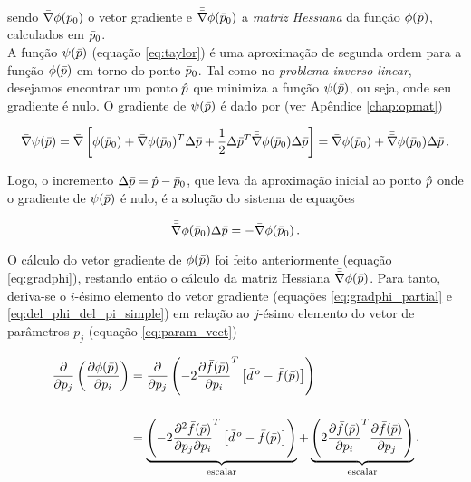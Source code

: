 \noindent sendo $\bar{\nabla}\phi(\bar{p}_0)$ o vetor gradiente  e
$\bar{\bar{\nabla}}\phi(\bar{p}_0)$ a {\it matriz Hessiana} da função $\phi(\bar{p})$,
calculados em $\bar{p}_0$.
\\
\indent A função $\psi(\bar{p})$ (equação \ref{eq:taylor}) é uma aproximação
de segunda ordem para a função $\phi(\bar{p})$ em torno do ponto $\bar{p}_0$.
Tal como no {\it problema inverso linear}, desejamos encontrar um ponto $\hat{p}$
que minimiza a função $\psi(\bar{p})$, ou seja, onde seu gradiente é nulo.
O gradiente de $\psi(\bar{p})$ é dado por (ver Apêndice \ref{chap:opmat})

\begin{equation}
\bar{\nabla}\psi(\bar{p}) = \bar{\nabla}\left[
    \phi(\bar{p}_0) +
    \bar{\nabla}\phi(\bar{p}_0)^T\Delta\bar{p} +
    \frac{1}{2}\Delta\bar{p}^T\bar{\bar{\nabla}}\phi(\bar{p}_0)\Delta\bar{p}
    \right] =
    \bar{\nabla}\phi(\bar{p}_0) + \bar{\bar{\nabla}}\phi(\bar{p}_0)\Delta\bar{p}
    \thinspace .
\end{equation}

\noindent Logo, o incremento $\Delta\bar{p} = \hat{p} - \bar{p}_0$, que leva
da aproximação inicial ao ponto $\hat{p}$ onde o gradiente de $\psi(\bar{p})$ é
nulo, é a solução do sistema de equações

\begin{equation}
     \bar{\bar{\nabla}}\phi(\bar{p}_0)\Delta\bar{p} = -\bar{\nabla}\phi(\bar{p}_0)
    \thinspace .
\label{eq:sistema_normal_nlin}
\end{equation}

\indent O cálculo do vetor gradiente de $\phi(\bar{p})$ foi feito anteriormente
(equação \ref{eq:gradphi}), restando então o cálculo da matriz Hessiana
$\bar{\bar{\nabla}}\phi(\bar{p})$.
Para tanto, deriva-se o $i$-ésimo elemento do vetor gradiente
(equações \ref{eq:gradphi_partial} e \ref{eq:del_phi_del_pi_simple}) em relação
ao $j$-ésimo elemento do vetor de parâmetros $p_j$ (equação \ref{eq:param_vect})

\begin{equation}
\begin{split}
\dfrac{\partial}{\partial p_j}\left(\dfrac{\partial \phi(\bar{p})}{\partial p_i}\right)
&=
\dfrac{\partial}{\partial p_j}\left(
    -2\dfrac{\partial\bar{f}(\bar{p})}{\partial p_i}^T
    \left[\bar{d}^{\thinspace o} - \bar{f}(\bar{p})\right]
    \right)
\\[0.5cm]
&=
\underbrace{
\left( -2\dfrac{\partial^2 \bar{f}(\bar{p})}{\partial p_j \partial p_i}^T
\left[\bar{d}^{\thinspace o} - \bar{f}(\bar{p})\right]
\right)}_{\text{escalar}} +
\underbrace{
\left( 2 \dfrac{\partial\bar{f}(\bar{p})}{\partial p_i}^T
    \dfrac{\partial\bar{f}(\bar{p})}{\partial p_j} \right)}_{\text{escalar}} .
\end{split}
\label{eq:hessian_ij_exact}
\end{equation}

